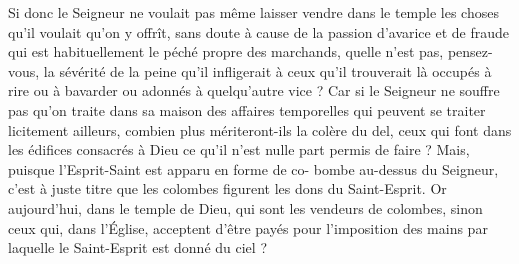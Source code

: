 Si donc le Seigneur ne voulait pas même laisser vendre dans le temple les choses qu’il voulait qu'on y offrît, sans doute à cause de la passion d’avarice et de fraude qui est habituellement le péché propre des marchands, quelle n’est pas, pensez-vous, la sévérité de la peine qu’il infligerait à ceux qu’il trouverait là occupés à rire ou à bavarder ou adonnés à quelqu’autre vice ? Car si le Seigneur ne souffre pas qu’on traite dans sa maison des affaires temporelles qui peuvent se traiter licitement ailleurs, combien plus mériteront-ils la colère du del, ceux qui font dans les édifices consacrés à Dieu ce qu’il n’est nulle part permis de faire ? Mais, puisque l’Esprit-Saint est apparu en forme de co- bombe au-dessus du Seigneur, c’est à juste titre que les colombes figurent les dons du Saint-Esprit. Or aujourd’hui, dans le temple de Dieu, qui sont les vendeurs de colombes, sinon ceux qui, dans l’Église, acceptent d’être payés pour l’imposition des mains par laquelle le Saint-Esprit est donné du ciel ?
